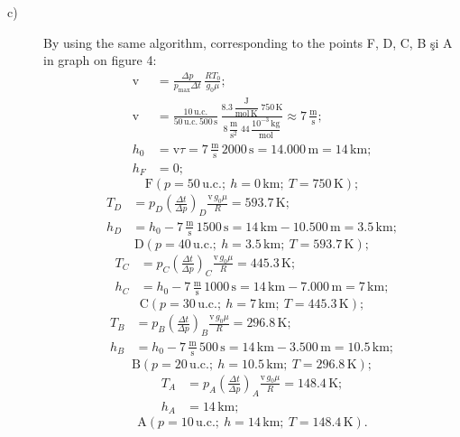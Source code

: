 \begin{description}
\item[c)]
By using the same algorithm, corresponding to the points F, D, C, B \c{s}i A in graph on
figure 4: %
\begin{align*}
\mathrm{v} &= \frac{\Delta p}{p_{\max}\Delta t}\,\frac{RT_0}{g_0\mu};\\
\mathrm{v} &= \frac{10\,\mathrm{u.c.}}{50\,\mathrm{u.c.}\,500\,\mathrm{s}}\,
\frac{8.3\,\dfrac{\mathrm{J}}{\mathrm{mol\,K}}\;750\,\mathrm{K}}
     {8\,\dfrac{\mathrm{m}}{\mathrm{s}^2}\;44\,\dfrac{10^{-3}\,\mathrm{kg}}{\mathrm{mol}}}
\approx 7\,\frac{\mathrm{m}}{\mathrm{s}};\\
h_0 &= \mathrm{v}\tau = 7\,\frac{\mathrm{m}}{\mathrm{s}}\,2000\,\mathrm{s}
= 14.000\,\mathrm{m} = 14\,\mathrm{km};\\
h_F &= 0;
\end{align*}
\[
\mathrm{F}(p = 50\,\mathrm{u.c.};\ h = 0\,\mathrm{km};\ T = 750\,\mathrm{K});
\]
\begin{align*}
T_D &= p_D\left(\frac{\Delta t}{\Delta p}\right)_{\!D}\frac{\mathrm{v}\,g_0\mu}{R}
= 593.7\,\mathrm{K};\\
h_D &= h_0 - 7\,\frac{\mathrm{m}}{\mathrm{s}}\,1500\,\mathrm{s}
= 14\,\mathrm{km} - 10.500\,\mathrm{m} = 3.5\,\mathrm{km};
\end{align*}
\[
\mathrm{D}(p = 40\,\mathrm{u.c.};\ h = 3.5\,\mathrm{km};\ T = 593.7\,\mathrm{K});
\]
\begin{align*}
T_C &= p_C\left(\frac{\Delta t}{\Delta p}\right)_{\!C}\frac{\mathrm{v}\,g_0\mu}{R}
= 445.3\,\mathrm{K};\\
h_C &= h_0 - 7\,\frac{\mathrm{m}}{\mathrm{s}}\,1000\,\mathrm{s}
= 14\,\mathrm{km} - 7.000\,\mathrm{m} = 7\,\mathrm{km};
\end{align*}
\[
\mathrm{C}(p = 30\,\mathrm{u.c.};\ h = 7\,\mathrm{km};\ T = 445.3\,\mathrm{K});
\]
\begin{align*}
T_B &= p_B\left(\frac{\Delta t}{\Delta p}\right)_{\!B}\frac{\mathrm{v}\,g_0\mu}{R}
= 296.8\,\mathrm{K};\\
h_B &= h_0 - 7\,\frac{\mathrm{m}}{\mathrm{s}}\,500\,\mathrm{s}
= 14\,\mathrm{km} - 3.500\,\mathrm{m} = 10.5\,\mathrm{km};
\end{align*}
\[
\mathrm{B}(p = 20\,\mathrm{u.c.};\ h = 10.5\,\mathrm{km};\ T = 296.8\,\mathrm{K});
\]
\begin{align*}
T_A &= p_A\left(\frac{\Delta t}{\Delta p}\right)_{\!A}\frac{\mathrm{v}\,g_0\mu}{R}
= 148.4\,\mathrm{K};\\
h_A &= 14\,\mathrm{km};
\end{align*}
\[
\mathrm{A}(p = 10\,\mathrm{u.c.};\ h = 14\,\mathrm{km};\ T = 148.4\,\mathrm{K}).
\]


\end{description}
